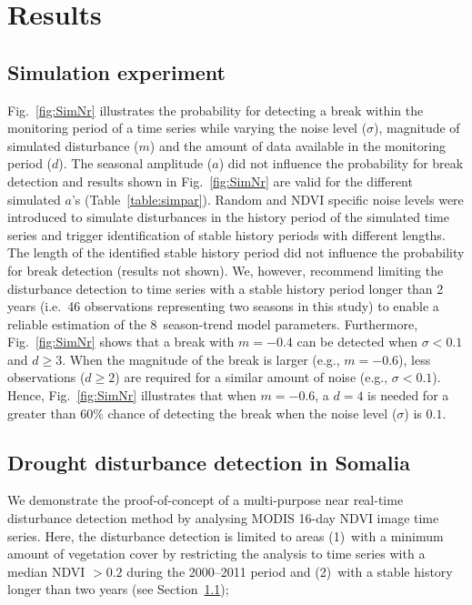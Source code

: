 \documentclass[authoryear,preprint,review,10pt]{elsarticle}
\begin{document}
\section{Results}

\subsection{Simulation experiment} \label{sec:DiscSim}

Fig.~\ref{fig:SimNr} illustrates the probability for detecting a break within the monitoring period of a time series while varying the noise level ($\sigma$), magnitude of simulated disturbance ($m$) and the amount of data available in the monitoring period ($d$). The seasonal amplitude ($a$) did not influence the probability for break detection and results shown in Fig.~\ref{fig:SimNr}  are valid for the different simulated $a$'s (Table~\ref{table:simpar}). 
Random and NDVI specific noise levels were introduced to simulate disturbances in the history period of the simulated time series and trigger identification of stable history periods with different lengths. The length of the identified stable history period did not influence the probability for break detection (results not shown). We, however, recommend limiting the disturbance detection to time series with a stable history period longer than 2 years (i.e.\ 46 observations representing two seasons in this study) to enable a reliable estimation of the 8~season-trend model parameters. Furthermore, Fig.~\ref{fig:SimNr} shows that a break with $m = -0.4$ can be detected when $\sigma < 0.1$ and $d  \geq 3$.  When the magnitude of the break is larger (e.g., $m = -0.6$), less observations ($d \geq 2$) are required for a similar amount of noise (e.g., $\sigma < 0.1$). Hence, Fig.~\ref{fig:SimNr} illustrates that when $m = -0.6$, a $d=4$ is needed for a greater than $60\%$ chance of detecting the break when the noise level ($\sigma$) is $0.1$.



\subsection{Drought disturbance detection in Somalia} \label{sec:DiscReal}

We demonstrate the proof-of-concept of a multi-purpose near real-time disturbance detection method by analysing MODIS 16-day NDVI image time series. Here, the disturbance detection is limited to areas (1)~with a minimum amount of vegetation cover by restricting the analysis to time series with a median NDVI $>0.2$ during the 2000--2011 period \citep{Vrieling:2011da} and (2)~with a stable history longer than two years (see Section~\ref{sec:DiscSim});
\end{document}
